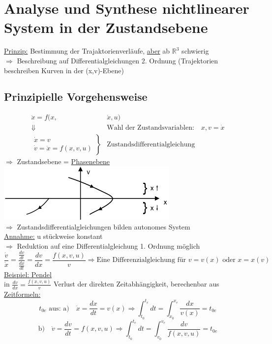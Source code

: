 \documentclass[openany,a4paper,11pt]{book}
\begin{document}
\chapter[Analyse \& Synthese in der Zustandsebene]{Analyse und Synthese nichtlinearer System in der Zustandsebene}
\uline{Prinzip:} Bestimmung der Trajaktorienverläufe, \uline{aber} ab $\mathbb{R}^3$ schwierig\\
$\Rightarrow$ Beschreibung auf Differentialgleichungen 2. Ordnung (Trajektorien beschreiben Kurven in der (x,v)-Ebene)
\section{Prinzipielle Vorgehensweise}
\[\begin{split}
\ddot{x}=f(x,&\dot{x},u)\\
\Downarrow &\text{Wahl der Zustandsvariablen:}  \quad x, v=\dot{x}\\
\left.
\begin{array}{r}
\dot{x}=v\\
\dot{v}=\ddot{x}=f(x,v,u)
\end{array}
\right\} &\text{Zustandsdifferentialgleichung}   
\end{split} \]
$\Rightarrow$ Zustandsebene = \uline{Phasenebene}\\
\includegraphics[width=3.5in]{imgs/NLR8.png} \\
$\Rightarrow$ Zustandsdifferentialgleichungen bilden autonomes System\\
\uline{Annahme:} u stückweise konstant \\
$\Rightarrow$ Reduktion auf eine Differentialgleichung 1. Ordnung möglich
\[\frac{\dot{v}}{\dot{x}}=\frac{\frac{dv}{dt}}{\frac{dx}{dt}}=\frac{dv}{dx}=\frac{f(x,v,u)}{v} \Rightarrow \text{Eine Differenzialgleichung für } v=v(x) \text{ oder } x=x(v)\]
\uline{Beispiel: Pendel} \\
in $\frac{dv}{dx}=\frac{f(x,v,u)}{v}$  Verlust der direkten Zeitabhängigkeit, berechenbar aus \uline{Zeitformeln:}
\[t_{0e} \text{ aus: }\text{a)}\quad \dot{x}=\frac{dx}{dt}=v(x) \Rightarrow \int_{t_0}^{t_e}dt=\int_{x_0}^{x_e}\frac{dx}{v(x)}=t_{0e}\]
\[\text{b)}\quad \dot{v}=\frac{dv}{dt}=f(x,v,u) \Rightarrow \int_{t_0}^{t_e}dt=\int_{v_0}^{v_e}\frac{dv}{f(x,v,u)}=t_{0e}\]
\end{document}
